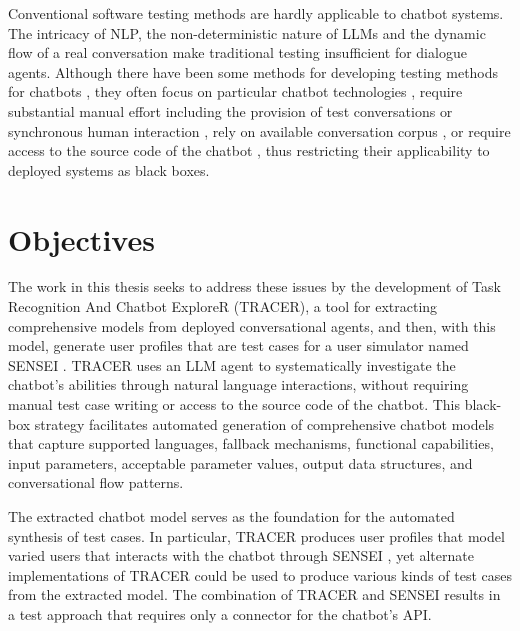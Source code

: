 Conventional software testing methods are hardly applicable to chatbot systems.
The intricacy of \ac{NLP}, the non-deterministic nature of \acp{LLM} and the dynamic flow of a real conversation make traditional testing insufficient for dialogue agents.
Although there have been some methods for developing testing methods for chatbots \cite{cuadradoIntegratingStaticQuality2024, canizaresMeasuringClusteringHeterogeneous2024}, they often focus on particular chatbot technologies \autocite{RasaTest2025}, require substantial manual effort including the provision of test conversations \autocite{CyaraBotium, RasaTest2025} or synchronous human interaction \autocite{renEvaluationTechniquesChatbot2019}, rely on available conversation corpus \autocite{vasconcelosBottesterTestingConversational2017}, or require access to the source code of the chatbot \autocite{canizaresCoveragebasedStrategiesAutomated2024, gomez-abajoMutationTestingTaskOriented2024, urricoMutaBotMutationTesting2024}, thus restricting their applicability to deployed systems as black boxes.

\section{Objectives}

The work in this thesis seeks to address these issues by the development of Task Recognition And Chatbot ExploreR (\ac{TRACER}), a tool for extracting comprehensive models from deployed conversational agents, and then, with this model, generate user profiles that are test cases for a user simulator named SENSEI \autocite{delaraAutomatedEndtoEndTesting2025, delaraSensei}.
\ac{TRACER} uses an \ac{LLM} agent to systematically investigate the chatbot's abilities through natural language interactions, without requiring manual test case writing or access to the source code of the chatbot.
This black-box strategy facilitates automated generation of comprehensive chatbot models that capture supported languages, fallback mechanisms, functional capabilities, input parameters, acceptable parameter values, output data structures, and conversational flow patterns.


The extracted chatbot model serves as the foundation for the automated synthesis of test cases.
In particular, \ac{TRACER} produces user profiles that model varied users that interacts with the chatbot through SENSEI \autocite{delaraAutomatedEndtoEndTesting2025, delaraSensei}, yet alternate implementations of \ac{TRACER} could be used to produce various kinds of test cases from the extracted model.
The combination of \ac{TRACER} and SENSEI results in a test approach that requires only a connector for the chatbot’s API.

